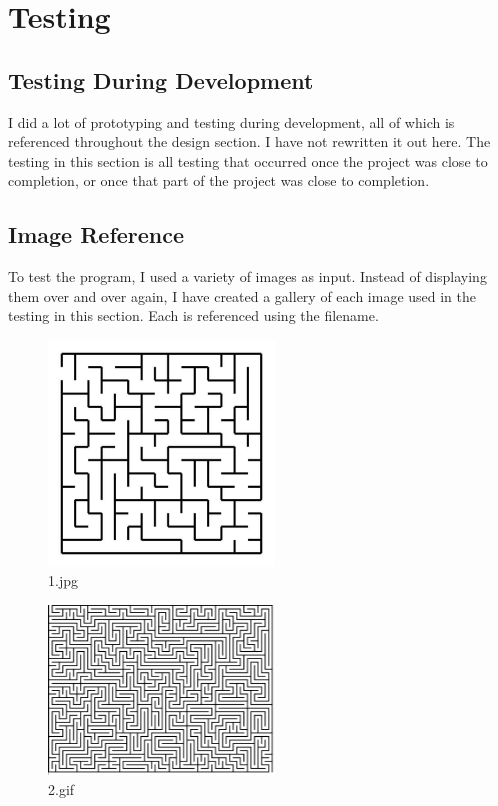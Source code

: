 \documentclass[titlepage]{article}
\begin{document}
\section{Testing}

\subsection{Testing During Development}
I did a lot of prototyping and testing during development, all of which is referenced throughout the design section. I have not rewritten it out here. The testing in this section is all testing that occurred once the project was close to completion, or once that part of the project was close to completion.

\subsection{Image Reference}
To test the program, I used a variety of images as input. Instead of displaying them over and over again, I have created a gallery of each image used in the testing in this section. Each is referenced using the filename.

\begin{figure}[H]
  \centering
  \includegraphics[width=6cm]{1.jpg}
  \caption{1.jpg}
  \label{fig:dijk}
\end{figure}

\begin{figure}[H]
  \centering
  \includegraphics[width=6cm]{2.png}
  \caption{2.gif}
  \label{fig:dijk}
\end{figure}
\end{document}
